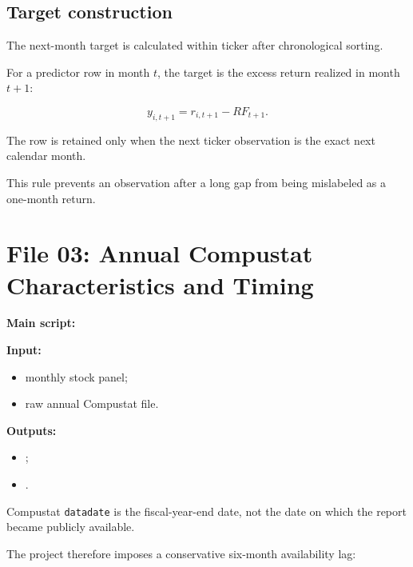 \documentclass[11pt,a4paper]{article}
\newcommand{\code}[1]{\texttt{#1}}
\begin{document}
\subsection{Target construction}

The next-month target is calculated within ticker after chronological sorting.

For a predictor row in month \(t\), the target is the excess return realized in
month \(t+1\):

\[
  y_{i,t+1}
  =
  r_{i,t+1}
  -
  RF_{t+1}.
\]

The row is retained only when the next ticker observation is the exact next
calendar month.

This rule prevents an observation after a long gap from being mislabeled as a
one-month return.


\section{File 03: Annual Compustat Characteristics and Timing}
\label{sec:compustat}

\textbf{Main script:}

\begin{center}
\end{center}

\textbf{Input:}

\begin{itemize}
  \item monthly stock panel;
  \item raw annual Compustat file.
\end{itemize}

\textbf{Outputs:}

\begin{itemize}
  \item {};
  \item {}.
\end{itemize}

Compustat \code{datadate} is the fiscal-year-end date, not the date on which the
report became publicly available.

The project therefore imposes a conservative six-month availability lag:
\end{document}
